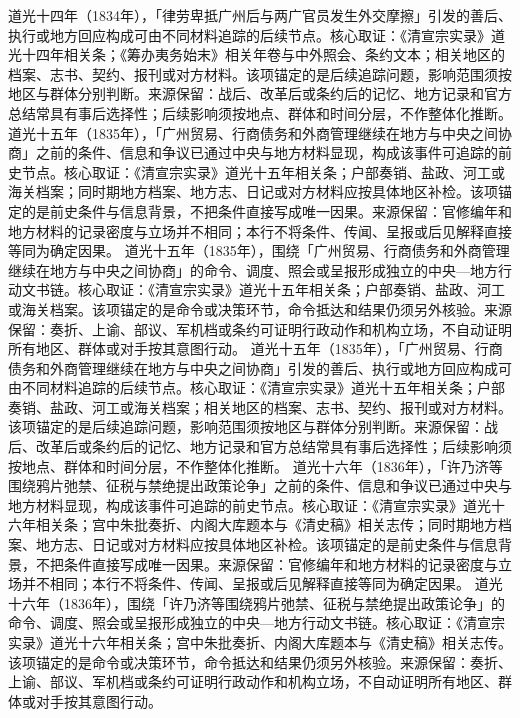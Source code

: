 道光十四年（1834年），「律劳卑抵广州后与两广官员发生外交摩擦」引发的善后、执行或地方回应构成可由不同材料追踪的后续节点。核心取证：《清宣宗实录》道光十四年相关条；《筹办夷务始末》相关年卷与中外照会、条约文本；相关地区的档案、志书、契约、报刊或对方材料。该项锚定的是后续追踪问题，影响范围须按地区与群体分别判断。来源保留：战后、改革后或条约后的记忆、地方记录和官方总结常具有事后选择性；后续影响须按地点、群体和时间分层，不作整体化推断。
道光十五年（1835年），「广州贸易、行商债务和外商管理继续在地方与中央之间协商」之前的条件、信息和争议已通过中央与地方材料显现，构成该事件可追踪的前史节点。核心取证：《清宣宗实录》道光十五年相关条；户部奏销、盐政、河工或海关档案；同时期地方档案、地方志、日记或对方材料应按具体地区补检。该项锚定的是前史条件与信息背景，不把条件直接写成唯一因果。来源保留：官修编年和地方材料的记录密度与立场并不相同；本行不将条件、传闻、呈报或后见解释直接等同为确定因果。
道光十五年（1835年），围绕「广州贸易、行商债务和外商管理继续在地方与中央之间协商」的命令、调度、照会或呈报形成独立的中央—地方行动文书链。核心取证：《清宣宗实录》道光十五年相关条；户部奏销、盐政、河工或海关档案。该项锚定的是命令或决策环节，命令抵达和结果仍须另外核验。来源保留：奏折、上谕、部议、军机档或条约可证明行政动作和机构立场，不自动证明所有地区、群体或对手按其意图行动。
道光十五年（1835年），「广州贸易、行商债务和外商管理继续在地方与中央之间协商」引发的善后、执行或地方回应构成可由不同材料追踪的后续节点。核心取证：《清宣宗实录》道光十五年相关条；户部奏销、盐政、河工或海关档案；相关地区的档案、志书、契约、报刊或对方材料。该项锚定的是后续追踪问题，影响范围须按地区与群体分别判断。来源保留：战后、改革后或条约后的记忆、地方记录和官方总结常具有事后选择性；后续影响须按地点、群体和时间分层，不作整体化推断。
道光十六年（1836年），「许乃济等围绕鸦片弛禁、征税与禁绝提出政策论争」之前的条件、信息和争议已通过中央与地方材料显现，构成该事件可追踪的前史节点。核心取证：《清宣宗实录》道光十六年相关条；宫中朱批奏折、内阁大库题本与《清史稿》相关志传；同时期地方档案、地方志、日记或对方材料应按具体地区补检。该项锚定的是前史条件与信息背景，不把条件直接写成唯一因果。来源保留：官修编年和地方材料的记录密度与立场并不相同；本行不将条件、传闻、呈报或后见解释直接等同为确定因果。
道光十六年（1836年），围绕「许乃济等围绕鸦片弛禁、征税与禁绝提出政策论争」的命令、调度、照会或呈报形成独立的中央—地方行动文书链。核心取证：《清宣宗实录》道光十六年相关条；宫中朱批奏折、内阁大库题本与《清史稿》相关志传。该项锚定的是命令或决策环节，命令抵达和结果仍须另外核验。来源保留：奏折、上谕、部议、军机档或条约可证明行政动作和机构立场，不自动证明所有地区、群体或对手按其意图行动。
